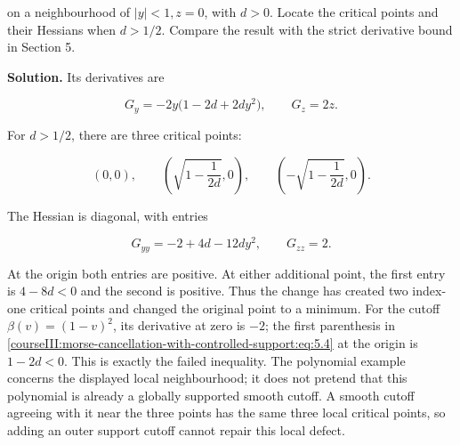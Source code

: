 on a neighbourhood of \(|y|<1,z=0\), with \(d>0\). Locate the critical points and their Hessians when \(d>1/2\). Compare the result with the strict derivative bound in Section 5.

\textbf{Solution.} Its derivatives are

\begin{equation}
G_y=-2y\bigl(1-2d+2dy^2\bigr),
\qquad G_z=2z.
\label{courseIII:morse-cancellation-with-controlled-support:eq:7.4}
\end{equation}

For \(d>1/2\), there are three critical points:

\begin{equation}
(0,0),\qquad
\left(\sqrt{1-\frac1{2d}},0\right),\qquad
\left(-\sqrt{1-\frac1{2d}},0\right).
\label{courseIII:morse-cancellation-with-controlled-support:eq:7.5}
\end{equation}

The Hessian is diagonal, with entries

\begin{equation}
G_{yy}=-2+4d-12dy^2,
\qquad G_{zz}=2.
\label{courseIII:morse-cancellation-with-controlled-support:eq:7.6}
\end{equation}

At the origin both entries are positive. At either additional point, the first entry is \(4-8d<0\) and the second is positive. Thus the change has created two index-one critical points and changed the original point to a minimum. For the cutoff \(\beta(v)=(1-v)^2\), its derivative at zero is \(-2\); the first parenthesis in \eqref{courseIII:morse-cancellation-with-controlled-support:eq:5.4} at the origin is \(1-2d<0\). This is exactly the failed inequality. The polynomial example concerns the displayed local neighbourhood; it does not pretend that this polynomial is already a globally supported smooth cutoff. A smooth cutoff agreeing with it near the three points has the same three local critical points, so adding an outer support cutoff cannot repair this local defect.
